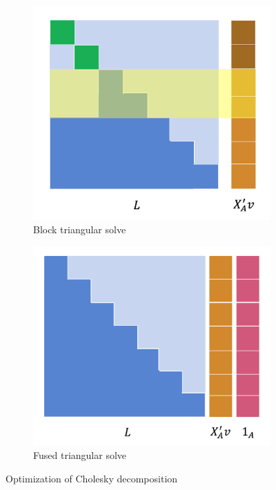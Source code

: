 \begin{figure}
\begin{subfigure}{.23\textwidth}
  \includegraphics[scale=0.2]{./pic/block_cholesky.png}
  \caption{Block triangular solve}
  \label{fig:block_cholesky}
\end{subfigure}%
\begin{subfigure}{.22\textwidth}
  \includegraphics[scale=0.155]{./pic/fuse_cholesky.png}
  \caption{Fused triangular solve}
  \label{fig:fuse_cholesky}
\end{subfigure}
\caption{Optimization of Cholesky decomposition}
\label{fig:test}
\end{figure}

